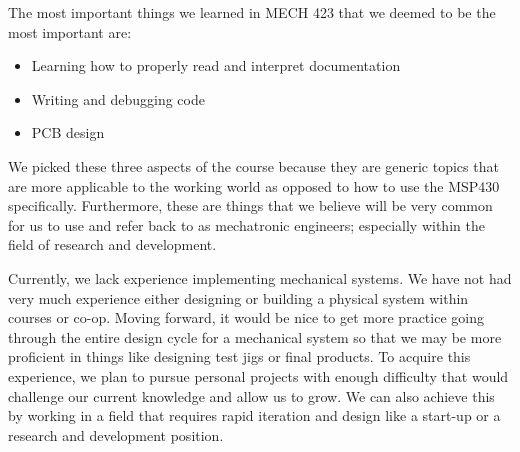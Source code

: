 \documentclass{notes}
\begin{document}
The most important things we learned in MECH 423 that we deemed to be the most important are:
\begin{itemize}
    \item Learning how to properly read and interpret documentation
    \item Writing and debugging code
    \item PCB design
\end{itemize}
We picked these three aspects of the course because they are generic topics that are more applicable to the working world as opposed to how to use the MSP430 specifically.
Furthermore, these are things that we believe will be very common for us to use and refer back to as mechatronic engineers; especially within the field of research and development.

Currently, we lack experience implementing mechanical systems.
We have not had very much experience either designing or building a physical system within courses or co-op.
Moving forward, it would be nice to get more practice going through the entire design cycle for a mechanical system so that we may be more proficient in things like designing test jigs or final products.
To acquire this experience, we plan to pursue personal projects with enough difficulty that would challenge our current knowledge and allow us to grow.
We can also achieve this by working in a field that requires rapid iteration and design like a start-up or a research and development position.
\end{document}
